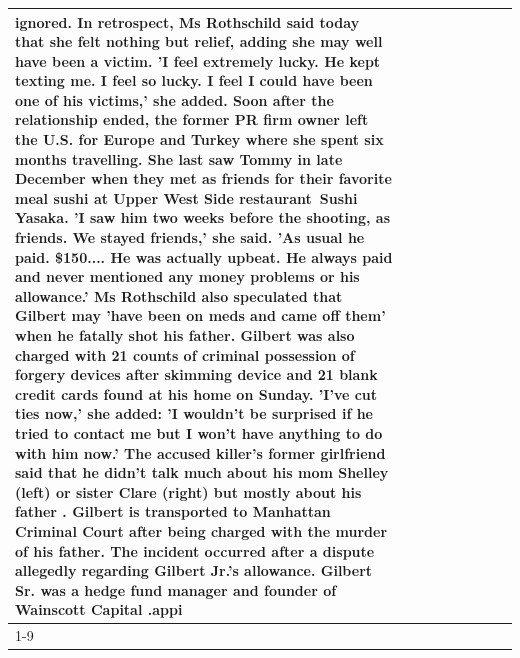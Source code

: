 \begin{table}[H]
\begin{tabular}{lllrlllll}
ignored. In retrospect, Ms Rothschild said today that she felt nothing but relief, adding she may well have been a victim. 'I feel extremely lucky. He kept texting me. I feel so lucky. I feel I could have been one of his victims,' she added. Soon after the relationship ended, the former PR firm owner left the U.S. for Europe and Turkey where she spent six months  travelling. She last saw Tommy in late December when they met as friends for their favorite meal sushi at Upper West Side restaurant Sushi Yasaka. 'I saw him two weeks before the shooting, as friends. We stayed friends,' she said. 'As usual he paid. \$150.... He was actually upbeat. He always paid and never mentioned any money problems or his allowance.' Ms Rothschild also speculated that Gilbert may 'have been on meds and came off them' when he fatally shot his father. Gilbert was also charged with 21 counts of criminal possession of forgery devices after skimming device and 21 blank credit cards found at his home on Sunday. 'I've cut ties now,' she added: 'I wouldn’t be surprised if he tried to contact me but I won’t have anything to do with him now.' The accused killer's former girlfriend said that he didn't talk much about his mom Shelley (left) or sister Clare (right) but mostly about his father . Gilbert is transported to Manhattan Criminal Court  after being charged with the murder of his father. The incident occurred after a dispute allegedly regarding Gilbert Jr.'s allowance. Gilbert Sr. was a hedge fund manager and founder of Wainscott Capital .appi \\
\cline{1-9}

\end{tabular}
\end{table}
